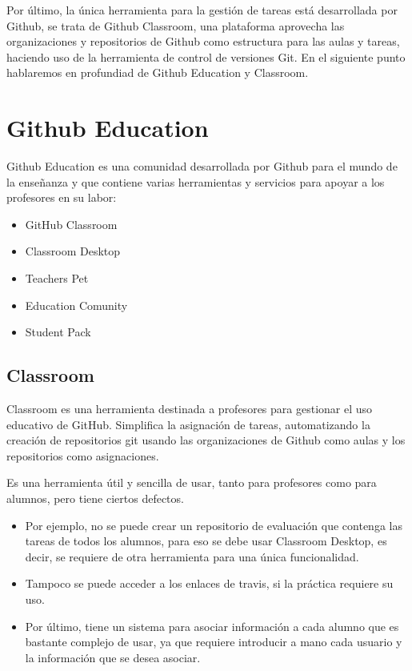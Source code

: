 Por último, la única herramienta para la gestión de tareas está desarrollada por Github, se trata de Github Classroom, una plataforma aprovecha las organizaciones y repositorios de Github como estructura para las aulas y tareas, haciendo uso de la herramienta de control de versiones Git. En el siguiente punto hablaremos en profundiad de Github Education y Classroom.


\section{Github Education}
\label{1:sec:2}

Github Education \cite{B12} es una comunidad desarrollada por Github  para el mundo de la enseñanza y que contiene varias herramientas  y servicios para apoyar a los profesores en su labor:

\begin{itemize}
  \item GitHub Classroom \cite{B13}
  \item Classroom Desktop
  \item Teachers Pet
  \item Education Comunity \cite{B12}
  \item Student Pack
\end{itemize}

\subsection{Classroom}

Classroom es una herramienta destinada a profesores para gestionar
el uso educativo de GitHub. Simplifica la asignación de tareas,
automatizando la creación de repositorios git usando las organizaciones
de Github como aulas y los repositorios como asignaciones. 

Es una
herramienta útil y sencilla de usar, tanto para profesores como
para alumnos, pero tiene ciertos defectos. 

\begin{itemize}
\item Por ejemplo, no se puede
crear un repositorio de evaluación que contenga las tareas de todos
los alumnos, para eso se debe usar Classroom Desktop, es decir, se
requiere de otra herramienta para una única funcionalidad. 

\item Tampoco
se puede acceder a los enlaces de travis, si la práctica requiere
su uso. 

\item Por último, tiene un sistema para asociar información a
cada alumno que es bastante complejo de usar, ya que requiere
introducir a mano cada usuario y la información que se desea asociar.
\end{itemize}

